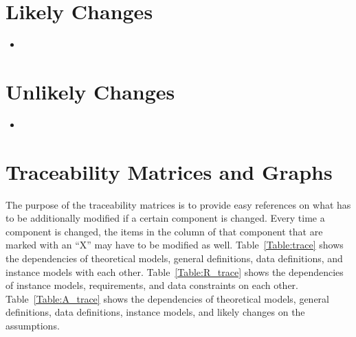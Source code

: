 \documentclass[12pt]{article}
\newcounter{lcnum} %
\begin{document}

\section{Likely Changes}    

\noindent \begin{itemize}

\item[LC\refstepcounter{lcnum}\thelcnum\label{LC_meaningfulLabel}:] 

\end{itemize}

\section{Unlikely Changes}    

\noindent \begin{itemize}

\item[LC\refstepcounter{lcnum}\thelcnum\label{LC_meaningfulLabel}:] 

\end{itemize}

\section{Traceability Matrices and Graphs}

The purpose of the traceability matrices is to provide easy references on what
has to be additionally modified if a certain component is changed.  Every time a
component is changed, the items in the column of that component that are marked
with an ``X'' may have to be modified as well.  Table~\ref{Table:trace} shows the
dependencies of theoretical models, general definitions, data definitions, and
instance models with each other. Table~\ref{Table:R_trace} shows the
dependencies of instance models, requirements, and data constraints on each
other. Table~\ref{Table:A_trace} shows the dependencies of theoretical models,
general definitions, data definitions, instance models, and likely changes on
the assumptions.

\end{document}
